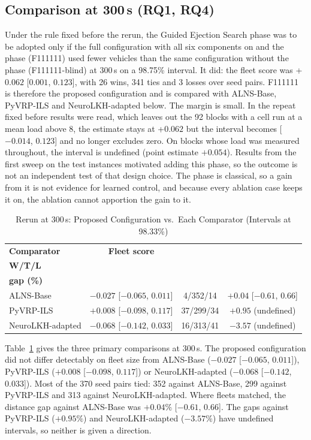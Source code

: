 \documentclass{ieeeaccess}
\begin{document}
\subsection{Comparison at 300\,s (RQ1, RQ4)}
\label{sec:primary_results}
Under the rule fixed before the rerun, the Guided Ejection Search phase was to be adopted only if the full configuration with all six components on and the phase (F111111) used fewer vehicles than the same configuration without the phase (F111111-blind) at 300\,s on a 98.75\% interval. It did: the fleet score was +$0.062$ [$0.001$, $0.123$], with 26 wins, 341 ties and 3 losses over seed pairs. F111111 is therefore the proposed configuration and is compared with ALNS-Base, PyVRP-ILS and NeuroLKH-adapted below. The margin is small. In the repeat fixed before results were read, which leaves out the 92 blocks with a cell run at a mean load above 8, the estimate stays at +$0.062$ but the interval becomes [$-0.014$, $0.123$] and no longer excludes zero. On blocks whose load was measured throughout, the interval is undefined (point estimate $+0.054$). Results from the first sweep on the test instances motivated adding this phase, so the outcome is not an independent test of that design choice. The phase is classical, so a gain from it is not evidence for learned control, and because every ablation case keeps it on, the ablation cannot apportion the gain to it.

\begin{table}[!t]
\caption{Rerun at 300\,s: Proposed Configuration vs.\ Each Comparator (Intervals at 98.33\%)}
\label{tab:primary}
\centering
\scriptsize
\setlength{\tabcolsep}{1.5pt}
\begin{tabular}{l c c c}
\toprule
\textbf{Comparator} & \textbf{Fleet score} & \makecell{\textbf{Seed pairs}\\\textbf{W/T/L}} & \makecell{\textbf{Matched TD}\\\textbf{gap (\%)}} \\
\midrule
ALNS-Base & $-0.027$ [$-0.065$, $0.011$] & 4/352/14 & $+0.04$ [$-0.61$, $0.66$] \\
PyVRP-ILS & $+0.008$ [$-0.098$, $0.117$] & 37/299/34 & $+0.95$ (undefined) \\
NeuroLKH-adapted & $-0.068$ [$-0.142$, $0.033$] & 16/313/41 & $-3.57$ (undefined) \\
\bottomrule
\end{tabular}
\end{table}

Table~\ref{tab:primary} gives the three primary comparisons at 300\,s. The proposed configuration did not differ detectably on fleet size from ALNS-Base ($-0.027$ [$-0.065$, $0.011$]), PyVRP-ILS ($+0.008$ [$-0.098$, $0.117$]) or NeuroLKH-adapted ($-0.068$ [$-0.142$, $0.033$]). Most of the 370 seed pairs tied: 352 against ALNS-Base, 299 against PyVRP-ILS and 313 against NeuroLKH-adapted. Where fleets matched, the distance gap against ALNS-Base was $+0.04\%$ [$-0.61$, $0.66$]. The gaps against PyVRP-ILS ($+0.95\%$) and NeuroLKH-adapted ($-3.57\%$) have undefined intervals, so neither is given a direction.
\end{document}
